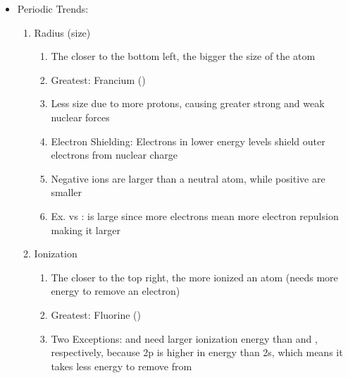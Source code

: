 \documentclass[12pt]{article}
\begin{document}
\begin{itemize}
\begin{enumerate}
      \item {}: 

      \item {}: 

    \end{enumerate}

  \item Periodic Trends:

    \begin{enumerate}

      \item Radius (size)

        \begin{enumerate}

          \item The closer to the bottom left, the bigger the size of the atom

          \item Greatest: Francium ()

          \item Less size due to more protons, causing greater strong and weak nuclear forces

          \item Electron Shielding: Electrons in lower energy levels shield outer electrons from nuclear charge

          \item Negative ions are larger than a neutral atom, while positive are smaller

          \item Ex.  vs :  is large since more electrons mean more electron repulsion making it larger

        \end{enumerate}

      \item Ionization

        \begin{enumerate}

          \item The closer to the top right, the more ionized an atom (needs more energy to remove an electron)

          \item Greatest: Fluorine ()

          \item Two Exceptions:  and  need larger ionization energy than  and , respectively, because 2p is higher in energy than 2s, which means it takes less energy to remove from 


\end{enumerate}
\end{enumerate}
\end{itemize}
\end{document}
